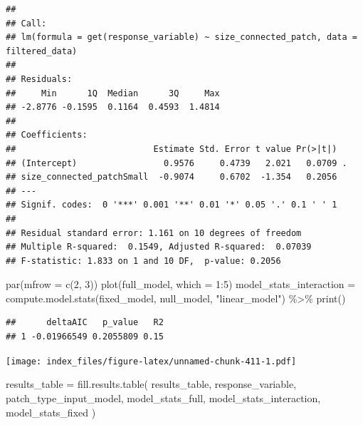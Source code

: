 \documentclass[
]{article}
\newenvironment{Shaded}{\begin{snugshade}}{\end{snugshade}}
\newcommand{\AttributeTok}[1]{\textcolor[rgb]{0.77,0.63,0.00}{#1}}
\newcommand{\DecValTok}[1]{\textcolor[rgb]{0.00,0.00,0.81}{#1}}
\newcommand{\FunctionTok}[1]{\textcolor[rgb]{0.00,0.00,0.00}{#1}}
\newcommand{\NormalTok}[1]{#1}
\newcommand{\OtherTok}[1]{\textcolor[rgb]{0.56,0.35,0.01}{#1}}
\newcommand{\SpecialCharTok}[1]{\textcolor[rgb]{0.00,0.00,0.00}{#1}}
\newcommand{\StringTok}[1]{\textcolor[rgb]{0.31,0.60,0.02}{#1}}
\begin{document}
\begin{verbatim}
## 
## Call:
## lm(formula = get(response_variable) ~ size_connected_patch, data = filtered_data)
## 
## Residuals:
##     Min      1Q  Median      3Q     Max 
## -2.8776 -0.1595  0.1164  0.4593  1.4814 
## 
## Coefficients:
##                           Estimate Std. Error t value Pr(>|t|)  
## (Intercept)                 0.9576     0.4739   2.021   0.0709 .
## size_connected_patchSmall  -0.9074     0.6702  -1.354   0.2056  
## ---
## Signif. codes:  0 '***' 0.001 '**' 0.01 '*' 0.05 '.' 0.1 ' ' 1
## 
## Residual standard error: 1.161 on 10 degrees of freedom
## Multiple R-squared:  0.1549, Adjusted R-squared:  0.07039 
## F-statistic: 1.833 on 1 and 10 DF,  p-value: 0.2056
\end{verbatim}

\begin{Shaded}
\begin{Highlighting}[]
\FunctionTok{par}\NormalTok{(}\AttributeTok{mfrow =} \FunctionTok{c}\NormalTok{(}\DecValTok{2}\NormalTok{, }\DecValTok{3}\NormalTok{))}
\FunctionTok{plot}\NormalTok{(full\_model, }\AttributeTok{which =} \DecValTok{1}\SpecialCharTok{:}\DecValTok{5}\NormalTok{)}
\NormalTok{model\_stats\_interaction }\OtherTok{=} \FunctionTok{compute.model.stats}\NormalTok{(fixed\_model,}
\NormalTok{                                              null\_model,}
                                              \StringTok{"linear\_model"}\NormalTok{) }\SpecialCharTok{\%\textgreater{}\%}
  \FunctionTok{print}\NormalTok{()}
\end{Highlighting}
\end{Shaded}

\begin{verbatim}
##      deltaAIC   p_value   R2
## 1 -0.01966549 0.2055809 0.15
\end{verbatim}

\texttt{[image: index\_files/figure-latex/unnamed-chunk-411-1.pdf]}

\begin{Shaded}
\begin{Highlighting}[]
\NormalTok{results\_table }\OtherTok{=} \FunctionTok{fill.results.table}\NormalTok{(}
\NormalTok{  results\_table,}
\NormalTok{  response\_variable,}
\NormalTok{  patch\_type\_input\_model,}
\NormalTok{  model\_stats\_full,}
\NormalTok{  model\_stats\_interaction,}
\NormalTok{  model\_stats\_fixed}
\NormalTok{)}
\end{Highlighting}
\end{Shaded}
\end{document}
